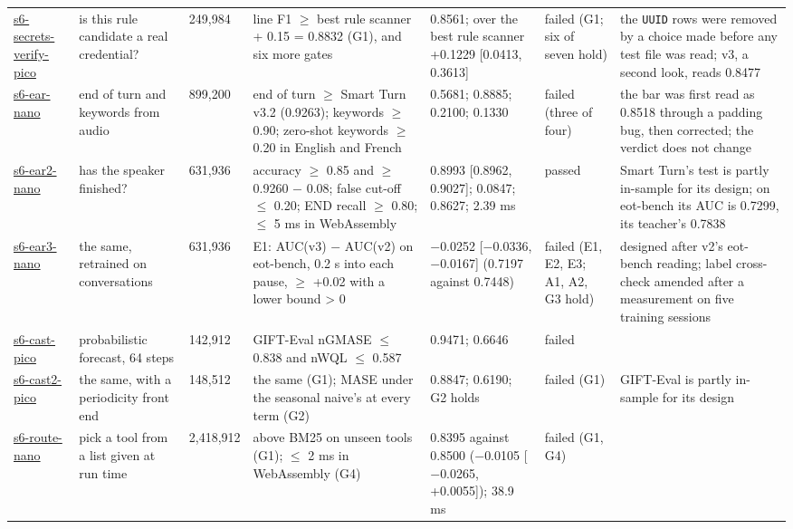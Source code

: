 \documentclass[10pt]{article}
\begin{document}
\begin{table}[p]
\begin{tabularx}{\linewidth}{@{}P{1.75cm}P{1.85cm}R{1.05cm}LLP{1.45cm}L@{}}
\href{https://maxgfr.github.io/skycmd/results/\#s6-secrets-verify-pico-failed}{s6-secrets-verify-pico} & is this rule candidate a real credential? & 249,984 & line F1 $\geq$ best rule scanner + 0.15 = 0.8832 (G1), and six more gates & 0.8561; over the best rule scanner +0.1229 [0.0413, 0.3613] & failed (G1; six of seven hold) & the \texttt{UUID} rows were removed by a choice made before any test file was read; v3, a second look, reads 0.8477 \\
\href{https://maxgfr.github.io/skycmd/results/\#s6-ear-nano-failed}{s6-ear-nano} & end of turn and keywords from audio & 899,200 & end of turn $\geq$ Smart Turn v3.2 (0.9263); keywords $\geq$ 0.90; zero-shot keywords $\geq$ 0.20 in English and French & 0.5681; 0.8885; 0.2100; 0.1330 & failed (three of four) & the bar was first read as 0.8518 through a padding bug, then corrected; the verdict does not change \\
\href{https://maxgfr.github.io/skycmd/results/\#s6-ear2-nano-passed}{s6-ear2-nano} & has the speaker finished? & 631,936 & accuracy $\geq$ 0.85 and $\geq$ 0.9260 $-$ 0.08; false cut-off $\leq$ 0.20; END recall $\geq$ 0.80; $\leq$ 5 ms in WebAssembly & 0.8993 [0.8962, 0.9027]; 0.0847; 0.8627; 2.39 ms & passed & Smart Turn's test is partly in-sample for its design; on eot-bench its AUC is 0.7299, its teacher's 0.7838 \\
\href{https://maxgfr.github.io/skycmd/results/\#s6-ear3-nano-failed}{s6-ear3-nano} & the same, retrained on conversations & 631,936 & E1: AUC(v3) $-$ AUC(v2) on eot-bench, 0.2 s into each pause, $\geq$ +0.02 with a lower bound \textgreater{} 0 & $-$0.0252 [$-$0.0336, $-$0.0167] (0.7197 against 0.7448) & failed (E1, E2, E3; A1, A2, G3 hold) & designed after v2's eot-bench reading; label cross-check amended after a measurement on five training sessions \\
\href{https://maxgfr.github.io/skycmd/results/\#s6-cast-pico-failed}{s6-cast-pico} & probabilistic forecast, 64 steps & 142,912 & GIFT-Eval nGMASE $\leq$ 0.838 and nWQL $\leq$ 0.587 & 0.9471; 0.6646 & failed &  \\
\href{https://maxgfr.github.io/skycmd/results/\#s6-cast2-pico-failed}{s6-cast2-pico} & the same, with a periodicity front end & 148,512 & the same (G1); MASE under the seasonal naive's at every term (G2) & 0.8847; 0.6190; G2 holds & failed (G1) & GIFT-Eval is partly in-sample for its design \\
\href{https://maxgfr.github.io/skycmd/results/\#s6-route-nano-failed}{s6-route-nano} & pick a tool from a list given at run time & 2,418,912 & above BM25 on unseen tools (G1); $\leq$ 2 ms in WebAssembly (G4) & 0.8395 against 0.8500 ($-$0.0105 [$-$0.0265, +0.0055]); 38.9 ms & failed (G1, G4) &  \\

\end{tabularx}
\end{table}
\end{document}
